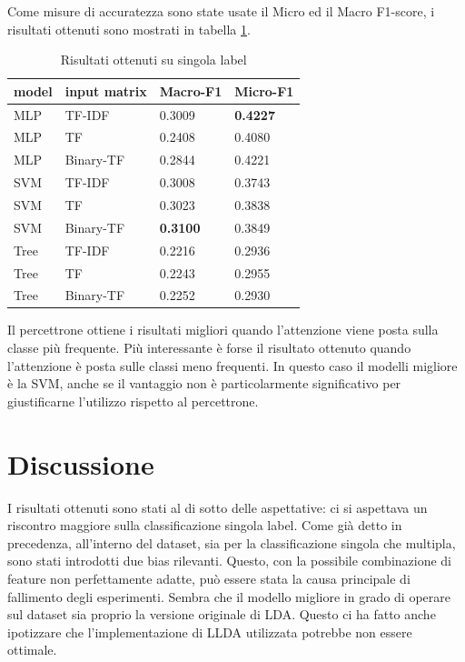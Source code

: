 \documentclass[technote]{IEEEtran}
\begin{document}
Come misure di accuratezza sono state usate il Micro ed il Macro
F1-score, i risultati ottenuti sono mostrati in tabella \ref{t_res_single}.
\begin{table}[H]
\centering
\caption{Risultati ottenuti su singola label}
\begin{tabular}{|l|l|l|l|}
\hline
\textbf{model} & \textbf{input matrix} & \textbf{Macro-F1} & \textbf{Micro-F1} \\ \hline
MLP            & TF-IDF                & 0.3009            & \textbf{0.4227}   \\ \hline
MLP            & TF                    & 0.2408            & 0.4080            \\ \hline
MLP            & Binary-TF             & 0.2844            & 0.4221            \\ \hline
SVM            & TF-IDF                & 0.3008            & 0.3743            \\ \hline
SVM            & TF                    & 0.3023            & 0.3838            \\ \hline
SVM            & Binary-TF             & \textbf{0.3100}   & 0.3849            \\ \hline
Tree           & TF-IDF                & 0.2216            & 0.2936            \\ \hline
Tree           & TF                    & 0.2243            & 0.2955            \\ \hline
Tree           & Binary-TF             & 0.2252            & 0.2930            \\ \hline
\end{tabular}
\label{t_res_single}
\end{table}
Il percettrone ottiene i risultati migliori quando l'attenzione viene posta
sulla classe più frequente.
Più interessante è forse il risultato ottenuto quando l'attenzione
è posta sulle classi meno frequenti. In questo caso il modelli migliore è la
SVM, anche se il vantaggio non è particolarmente significativo
per giustificarne l'utilizzo rispetto al percettrone.
\section{Discussione}
I risultati ottenuti sono stati al di sotto delle aspettative: ci si aspettava
un riscontro maggiore sulla classificazione singola label.
Come già detto in precedenza, all'interno del dataset, sia per
la classificazione singola che multipla, sono stati introdotti due bias
rilevanti.
Questo, con la possibile combinazione di feature non perfettamente adatte,
può essere stata la causa principale di fallimento degli esperimenti.
Sembra che il modello migliore in grado di operare
sul dataset sia proprio la versione originale di LDA.
Questo ci ha fatto anche ipotizzare che l'implementazione di LLDA utilizzata
potrebbe non essere ottimale.
\end{document}
